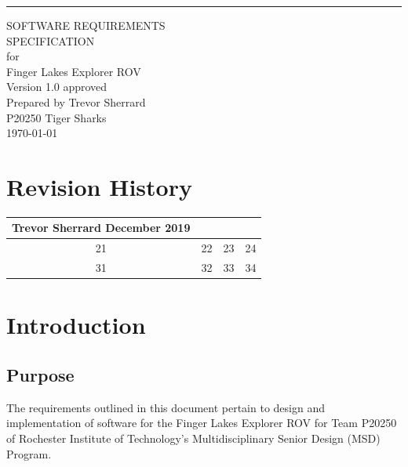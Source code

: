 \documentclass{scrreprt}
\date{}
\def\myversion{1.0 }
\begin{document}
\begin{flushright}
    \rule{16cm}{5pt}\vskip1cm
    \begin{bfseries}
        \Huge{SOFTWARE REQUIREMENTS\\ SPECIFICATION}\\
        \vspace{1.9cm}
        for\\
        \vspace{1.9cm}
        Finger Lakes Explorer ROV\\
        \vspace{1.9cm}
        \LARGE{Version \myversion approved}\\
        \vspace{1.9cm}
        Prepared by Trevor Sherrard\\
        \vspace{1.9cm}
        P20250 Tiger Sharks\\
        \vspace{1.9cm}
        \today\\
    \end{bfseries}
\end{flushright}

\tableofcontents


\chapter*{Revision History}

\begin{center}
    \begin{tabular}{|c|c|c|c|}
        \hline
	    Trevor Sherrard December 2019\\
        \hline
	    21 & 22 & 23 & 24\\
        \hline
	    31 & 32 & 33 & 34\\
        \hline
    \end{tabular}
\end{center}

\chapter{Introduction}

\section{Purpose}
The requirements outlined in this document pertain to design and implementation of software for the Finger Lakes Explorer ROV for Team P20250 of Rochester Institute of Technology's Multidisciplinary Senior Design (MSD) Program.
\end{document}
